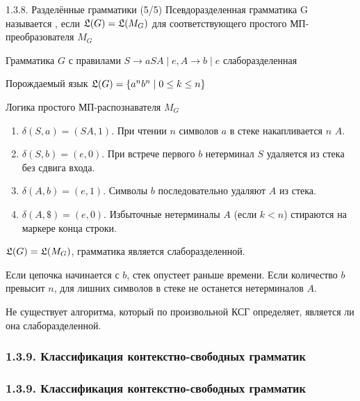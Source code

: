 \begin{frame}{1.3.8. Разделённые грамматики (5/5)}
Псевдоразделенная грамматика G называется , если $\frak{L}(G) = \frak{L}(M_G)$ для соответствующего простого МП-преобразователя $M_G$

\begin{example}
    Грамматика $G$ с правилами \(S \to a S A \mid e, A \to b \mid e\) слаборазделенная

    Порождаемый язык \(\frak{L} (G) = \{ a^n b^n \mid  0 \leq k \leq n \} \)

    Логика простого МП-распознавателя \( M_G \)

\begin{enumerate}
\item \( \delta(S, a) = (SA, 1) \). При чтении \( n \) символов \( a \) в стеке накапливается \( n \) \( A\).
\item \( \delta(S, b) = (e, 0) \). При встрече первого \( b \) нетерминал \( S \) удаляется из стека без сдвига входа.
\item \( \delta(A, b) = (e, 1) \). Символы \( b \) последовательно удаляют \( A \) из стека.
\item \( \delta(A, \$) = (e, 0) \). Избыточные нетерминалы \( A \) (если \( k < n \)) стираются на маркере конца строки.
\end{enumerate}

\( \frak{L}(G) = \frak{L}(M_G) \), грамматика является слаборазделенной.

\begin{remark}
    Если цепочка начинается с \( b \), стек опустеет раньше времени. Если количество \( b \) превысит \( n \), для лишних символов в стеке не останется нетерминалов \( A\).
\end{remark}
\end{example}
\begin{remark}
    Не существует алгоритма, который по произвольной КСГ определяет, является ли она слаборазделенной.
\end{remark}
\end{frame}



\subsubsection{1.3.9. Классификация контекстно-свободных грамматик}\label{1.3.9.}
\begin{frame}
\frametitle{1.3.9. Классификация контекстно-свободных грамматик}


\bigskip
{}
\end{frame}

